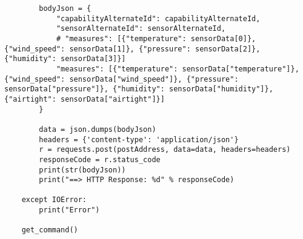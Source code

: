 \begin{lstlisting}
        bodyJson = {
            "capabilityAlternateId": capabilityAlternateId,
            "sensorAlternateId": sensorAlternateId,
            # "measures": [{"temperature": sensorData[0]}, {"wind_speed": sensorData[1]}, {"pressure": sensorData[2]}, {"humidity": sensorData[3]}]
            "measures": [{"temperature": sensorData["temperature"]}, {"wind_speed": sensorData["wind_speed"]}, {"pressure": sensorData["pressure"]}, {"humidity": sensorData["humidity"]}, {"airtight": sensorData["airtight"]}]
        }

        data = json.dumps(bodyJson)
        headers = {'content-type': 'application/json'}
        r = requests.post(postAddress, data=data, headers=headers)
        responseCode = r.status_code
        print(str(bodyJson))
        print("==> HTTP Response: %d" % responseCode)

    except IOError:
        print("Error")

    get_command()
\end{lstlisting}
\clearpage
